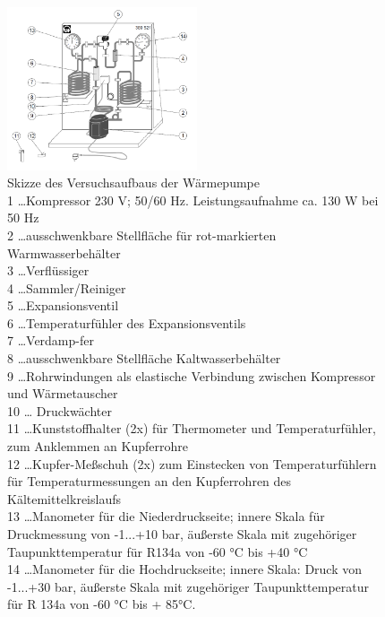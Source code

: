 \documentclass[12pt,english,ngerman]{scrartcl}
\begin{document}
\begin{figure}[H]
	\begin{center}
		\includegraphics[width =0.5\textwidth]{./figures/warmepumpe_skizze.PNG}
	\end{center}
	\caption[Skizze des Versuchsaufbaus der Wärmepumpe]{Skizze des Versuchsaufbaus der
		Wärmepumpe \cite[text]{unterlagen_warmepumpe}                             \\
		1 \dots Kompressor 230 V; 50/60 Hz. Leistungsaufnahme ca. 130 W bei 50 Hz \\
		2 \dots ausschwenkbare Stellfläche für rot-markierten Warmwasserbehälter  \\
		3 \dots Verflüssiger                                                      \\
		4 \dots Sammler/Reiniger                                                  \\
		5 \dots Expansionsventil                                                  \\
		6 \dots Temperaturfühler des Expansionsventils                            \\
		7 \dots Verdamp-fer                                                       \\
		8 \dots ausschwenkbare Stellfläche Kaltwasserbehälter \\
		9 \dots Rohrwindungen als
		elastische Verbindung zwischen Kompressor und Wärmetauscher \\
		10 \dots
		Druckwächter                                                              \\
		11 \dots Kunststoffhalter (2x) für Thermometer und Temperaturfühler, zum
		Anklemmen an Kupferrohre                                                  \\
		12 \dots Kupfer-Meßschuh (2x) zum Einstecken von Temperaturfühlern für
		Temperaturmessungen an den Kupferrohren des Kältemittelkreislaufs         \\
		13 \dots Manometer für die Niederdruckseite; innere Skala für Druckmessung von
		-1...+10 bar, äußerste Skala mit zugehöriger Taupunkttemperatur für R134a von
		-60 °C bis +40 °C                                                         \\
		14 \dots Manometer für die Hochdruckseite; innere Skala: Druck von -1...+30
		bar, äußerste Skala mit zugehöriger Taupunkttemperatur für R 134a von -60 °C
		bis + 85°C.
	}\label{fig:skizze_warmepumpe}
\end{figure}
\end{document}

